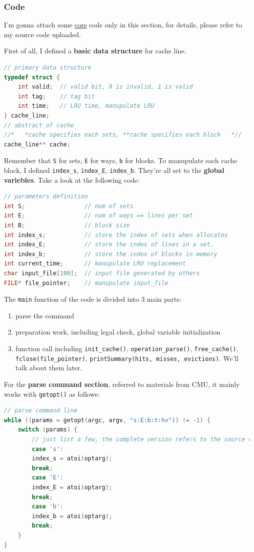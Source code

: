 \documentclass{article}
\begin{document}
\subsubsection{Code}

I'm gonna attach some \underline{core} code only in this section, for details, please refer to my source code uploaded.

First of all, I defined a \textbf{basic data structure} for cache line. 
\begin{lstlisting}[language=c]
// primary data structure
typedef struct {
	int valid;  // valid bit, 0 is invalid, 1 is valid
	int tag;    // tag bit
	int time;   // LRU time, manupulate LRU
} cache_line;
// abstract of cache
//*   *cache specifies each sets, **cache specifies each block   *//
cache_line** cache;
\end{lstlisting}

Remember that \lstinline|S| for sets, \lstinline|E| for ways, \lstinline|b| for blocks. To manupulate each cache block, I defined \lstinline|index_s|,  \lstinline|index_E|,  \lstinline|index_b|. They're all set to the \textbf{global variebles}. Take a look at the following code:
\begin{lstlisting}[language=c]
// parameters definition
int S;                 // num of sets
int E;                 // num of ways == lines per set
int B;                 // block size
int index_s;           // store the index of sets when allocates
int index_E;           // store the index of lines in a set.
int index_b;           // store the index of blocks in memory
int current_time;      // manupulate LRU replacement
char input_file[100];  // input file generated by others
FILE* file_pointer;    // manupulate input_file
\end{lstlisting}

The \lstinline|main| function of the code is divided into 3 main parts:
\begin{enumerate}
\item parse the command
\item preparation work, including legal check, global variable initialization
\item function call including \lstinline|init_cache()|, \lstinline|operation_parse()|, \lstinline|free_cache()|, \lstinline|fclose(file_pointer)|, \lstinline|printSummary(hits, misses, evictions)|. We'll talk about them later.
\end{enumerate}

For the \textbf{parse command section}, referred to materials from CMU, it mainly works with \lstinline|getopt()| as follows:
\begin{lstlisting}[language=c]
// parse command line
while ((params = getopt(argc, argv, "s:E:b:t:hv")) != -1) {
	switch (params) {
		// just list a few, the complete version refers to the source code pls
		case 's':
		index_s = atoi(optarg);
		break;
		case 'E':
		index_E = atoi(optarg);
		break;
		case 'b':
		index_b = atoi(optarg);
		break;
	}
}
\end{lstlisting}
\end{document}

